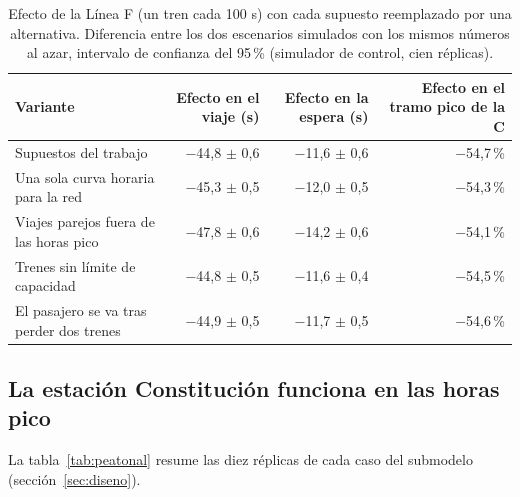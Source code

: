 \documentclass{article}
\begin{document}
\begin{table}[htbp]
  \centering\small
  \caption{Efecto de la Línea F (un tren cada 100 s) con cada supuesto reemplazado por una alternativa.
  Diferencia entre los dos escenarios simulados con los mismos números al azar, intervalo de confianza del
  95\,\% (simulador de control, cien réplicas).}
  \label{tab:sensibilidad}
  \begin{tabular}{lrrr}
    \toprule
    Variante & Efecto en el viaje (s) & Efecto en la espera (s) & Efecto en el tramo pico de la C \\
    \midrule
    Supuestos del trabajo & $-$44,8 $\pm$ 0,6 & $-$11,6 $\pm$ 0,6 & $-$54,7\,\% \\
    Una sola curva horaria para la red & $-$45,3 $\pm$ 0,5 & $-$12,0 $\pm$ 0,5 & $-$54,3\,\% \\
    Viajes parejos fuera de las horas pico & $-$47,8 $\pm$ 0,6 & $-$14,2 $\pm$ 0,6 & $-$54,1\,\% \\
    Trenes sin límite de capacidad & $-$44,8 $\pm$ 0,5 & $-$11,6 $\pm$ 0,4 & $-$54,5\,\% \\
    El pasajero se va tras perder dos trenes & $-$44,9 $\pm$ 0,5 & $-$11,7 $\pm$ 0,5 & $-$54,6\,\% \\
    \bottomrule
  \end{tabular}
\end{table}

\subsection{La estación Constitución funciona en las horas pico}
\label{sec:peatonal-resultados}

La tabla~\ref{tab:peatonal} resume las diez réplicas de cada caso del submodelo (sección~\ref{sec:diseno}).
\end{document}
